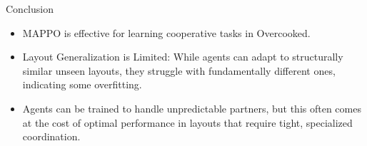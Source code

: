 \documentclass{beamer}
\begin{document}
\begin{frame}{Conclusion}
  \begin{itemize}
    \item MAPPO is effective for learning cooperative tasks in Overcooked.
    \item Layout Generalization is Limited: While agents can adapt to structurally similar unseen layouts, they struggle with fundamentally different ones, indicating some overfitting.
    \item Agents can be trained to handle unpredictable partners, but this often comes at the cost of optimal performance in layouts that require tight, specialized coordination.
  \end{itemize}
\end{frame}
\end{document}
